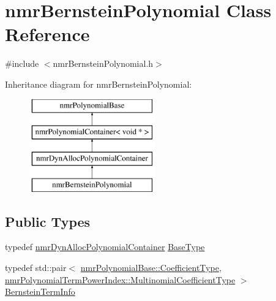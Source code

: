 \hypertarget{classnmr_bernstein_polynomial}{}\section{nmr\+Bernstein\+Polynomial Class Reference}
\label{classnmr_bernstein_polynomial}


{\ttfamily \#include $<$nmr\+Bernstein\+Polynomial.\+h$>$}

Inheritance diagram for nmr\+Bernstein\+Polynomial\+:\begin{figure}[H]
\begin{center}
\leavevmode
\includegraphics[height=4.000000cm]{de/d41/classnmr_bernstein_polynomial}
\end{center}
\end{figure}
\subsection*{Public Types}
\begin{DoxyCompactItemize}
\item 
typedef \hyperlink{classnmr_dyn_alloc_polynomial_container}{nmr\+Dyn\+Alloc\+Polynomial\+Container} \hyperlink{classnmr_bernstein_polynomial_a8a0eb11ca4ee788e0f3714dd0e1f2e53}{Base\+Type}
\item 
typedef std\+::pair$<$ \hyperlink{classnmr_polynomial_base_a8693efdfc8585ccb49abea69f74f3eef}{nmr\+Polynomial\+Base\+::\+Coefficient\+Type}, \hyperlink{classnmr_polynomial_term_power_index_a09f482da776cfb829e26ad1fb381ab94}{nmr\+Polynomial\+Term\+Power\+Index\+::\+Multinomial\+Coefficient\+Type} $>$ \hyperlink{classnmr_bernstein_polynomial_ad8d87d00b90dcd2de08a43e90c07a0a6}{Bernstein\+Term\+Info}
\end{DoxyCompactItemize}
